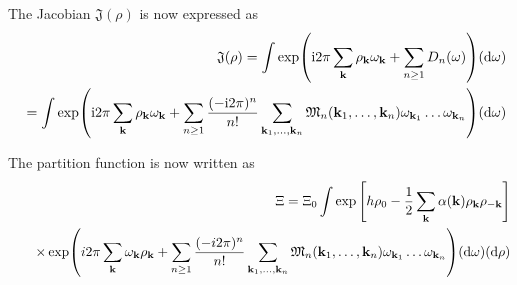 The Jacobian $\mathfrak{J}(\rho)$ is now expressed as
\begin{eqnarray}
	&&\mathfrak{J}(\rho) = \int \exp({\rm i} 2\pi \sum_{\vb k}\rho_{\vb k}\omega_{\vb k} + \sum_{n\geq 1} D_n(\omega) ) ({\rm d} \omega)
	\nonumber\\
	&&= \int \exp({\rm i} 2\pi \sum_{\vb k}\rho_{\vb k}\omega_{\vb k} 
	+ \sum_{n\geq 1} \frac{(-{\rm i}2\pi)^n}{n!}\sum_{\vb{k}_1,\dotsc,\vb{k}_n}\mathfrak{M}_n(\vb k_1, \dotsc, \vb k_n) \omega_{{\vb k}_1}\dotsc \omega_{{\vb k}_n}) ({\rm d} \omega)
	\nonumber
\end{eqnarray}

The partition function is now written as
\begin{eqnarray}
	&&\Xi = \Xi_0 \int \exp \left[h \rho_0 - \frac12
	\sum\limits_{\bf k} \alpha(\vb k) \rho_{\bf k}\rho_{-{\bf k}} \right]
	\\
	&&
	\quad \times
	\exp (i2\pi \sum\limits_{\bf k} \omega_{\bf k} \rho_{\bf k} + \sum_{n\ge 1} \frac{(-i2\pi)^n}{n!}\sum_{\vb{k}_1,\dotsc,\vb{k}_n} {\mathfrak M}_n(\vb{k}_1,\dotsc,\vb{k}_n) \omega_{\vb k_1}\dotsc\omega_{\vb{k}_n})
	({\rm d}\omega) ({\rm d}\rho) \nonumber
\end{eqnarray}
